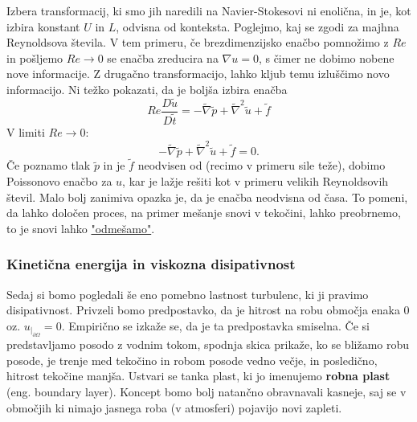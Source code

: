 \documentclass[mat2, tisk]{fmfdelo}
\begin{document}
Izbera transformacij, ki smo jih naredili na Navier-Stokesovi ni enolična, in je, kot 
izbira konstant $U$ in $L$, odvisna od konteksta. Poglejmo, kaj se zgodi za majhna 
Reynoldsova števila. V tem primeru, če brezdimenzijsko enačbo pomnožimo z $Re$ in pošljemo 
$Re \rightarrow 0$ se enačba zreducira na $\nabla u = 0$, s čimer ne dobimo nobene nove informacije.
Z drugačno transformacijo, lahko kljub temu izluščimo novo informacijo. Ni težko pokazati,
da je boljša izbira enačba 
\begin{equation}
Re\frac{D\tilde{u}}{D \tilde{t}} =  - \tilde{\nabla} \tilde{p}
+ \tilde{\nabla}^2 \tilde{u} + \tilde{f}
\end{equation}
V limiti $Re \rightarrow 0$:
$$
- \tilde{\nabla} \tilde{p}+ \tilde{\nabla}^2 \tilde{u} + \tilde{f} = 0.
$$
Če poznamo tlak $\tilde{p}$ in je $\tilde{f}$ neodvisen od (recimo v primeru sile teže), 
dobimo Poissonovo enačbo za $u$, kar je lažje rešiti kot v primeru velikih Reynoldsovih 
števil. Malo bolj zanimiva opazka je, da je enačba neodvisna od časa. To pomeni, da lahko 
določen proces, na primer mešanje snovi v tekočini, lahko preobrnemo, to je snovi 
lahko \href{https://www.youtube.com/watch?v=h1DnrWEOWeg&feature=youtu.be}{"odmešamo"}.  

\subsubsection{Kinetična energija in viskozna disipativnost}

Sedaj si bomo pogledali še eno pomebno lastnost turbulenc, ki ji pravimo disipativnost. 
Privzeli bomo predpostavko, da je hitrost na robu območja enaka $0$ oz. $u_{|_{\partial\Omega}} = 0$. 
Empirično se izkaže se, da je ta predpostavka smiselna. Če si predstavljamo posodo z 
vodnim tokom, spodnja skica prikaže, ko se bližamo robu posode, je trenje med tekočino
in robom posode vedno večje, in posledično, hitrost tekočine manjša. Ustvari se tanka plast, 
ki jo imenujemo \textbf{robna plast} (eng. boundary layer). Koncept bomo bolj natančno 
obravnavali kasneje, saj se v območjih ki nimajo jasnega roba (v atmosferi) pojavijo 
novi zapleti.
\end{document}
